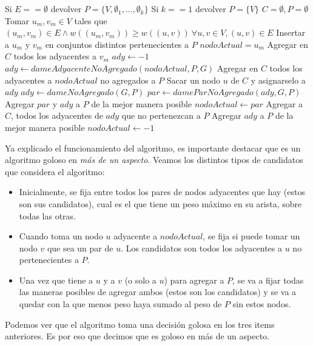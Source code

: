 \documentclass[a4paper]{article}
\begin{document}
\begin{algorithmic}[1]
	\State Si $E == \emptyset$ devolver $P = \{V, \emptyset_1, ..., \emptyset_k \}$
	\State Si $k == 1$ devolver $P = \{V\} $
	\newline
	\State $C = \emptyset, P = \emptyset$
	\State Tomar $u_m, v_m \in V$ tales que $(u_m, v_m) \in E \wedge w((u_m, v_m)) \geq w((u, v)) \ \forall u, v \in V, (u, v) \in E$
	\State Insertar a $u_m$ y $v_m$ en conjuntos distintos pertenecientes a $P$
	\State $nodoActual = u_m$
	\State Agregar en $C$ todos los adyacentes a $v_m$
	\newline
		\State $ady \gets -1$
			\State $ady \gets dameAdyacenteNoAgregado(nodoActual, P, G)$
			\State Agregar en $C$ todos los adyacentes a $nodoActual$ no agregados a $P$
		\Else
				\State Sacar un nodo $u$ de $C$ y asignarselo a $ady$
			\EndWhile
				\State $ady \gets dameNoAgregado(G, P)$
			\EndIf
		\EndIf
		\newline
				\State $par \gets dameParNoAgregado(ady, G, P)$
				\State Agregar $par$ y $ady$ a $P$ de la mejor manera posible
				\State $nodoActual \gets par$
				\State Agregar a $C$, todos los adyacentes de $ady$ que no pertenezcan a $P$
			\Else
				\State Agregar $ady$ a $P$ de la mejor manera posible
				\State $nodoActual \gets -1$
			\EndIf
	\EndWhile
\EndProcedure
\end{algorithmic}
\vspace{0.4cm}
Ya explicado el funcionamiento del algoritmo, es importante destacar que es un algoritmo goloso en \textit{más de un aspecto}. Veamos los distintos tipos de candidatos que considera el algoritmo:
\begin{itemize}
\item Inicialmente, se fija entre todos los pares de nodos adyacentes que hay (estos son sus candidatos), cual es el que tiene un peso máximo en su arista, sobre todas las otras.
\item Cuando toma un nodo $u$ adyacente a $nodoActual$, se fija si puede tomar un nodo $v$ que sea un par de $u$. Los candidatos son todos los adyacentes a $u$ no pertenecientes a $P$.
\item Una vez que tiene a $u$ y a $v$ (o solo a $u$) para agregar a $P$, se va a fijar todas las maneras posibles de agregar ambos (estos son los candidatos) y se va a quedar con la que menos peso haya sumado al peso de $P$ sin estos nodos.
\end{itemize}
Podemos ver que el algoritmo toma una decisión golosa en los tres items anteriores. Es por eso que decimos que es goloso en más de un aspecto.
\vspace{0.4cm}
\end{document}

